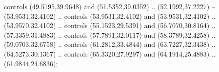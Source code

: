 \begin{scope}[y=0.80pt, x=0.80pt, yscale=-1.000000, xscale=1.000000, inner sep=0pt, outer sep=0pt]
    controls (49.5195,39.9648) and (51.5352,39.0352) .. (52.1992,37.2227) --
    (53.9531,32.4102) .. controls (53.9531,32.4102) and (53.9531,32.4102) ..
    (53.9570,32.4102) .. controls (55.1523,29.5391) and (56.7070,30.8164) ..
    (57.3359,31.4883) .. controls (57.7891,32.0117) and (58.3789,32.4258) ..
    (59.0703,32.6758) .. controls (61.2812,33.4844) and (63.7227,32.3438) ..
    (64.5273,30.1367) .. controls (65.3320,27.9297) and (64.1914,25.4883) ..
    (61.9844,24.6836);

\end{scope}

